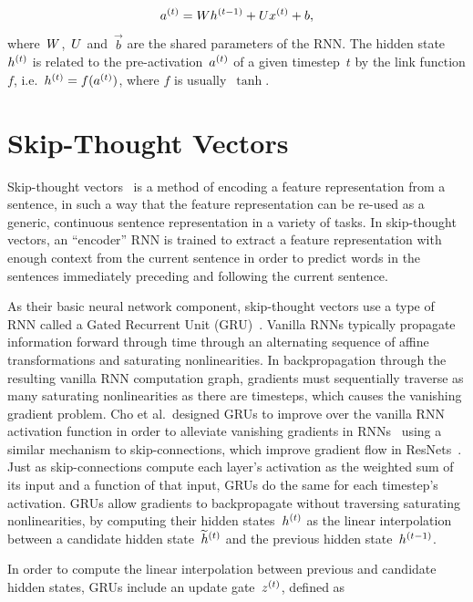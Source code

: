 \begin{equation}
        a^{(t)} = Wh^{(t - 1)} + Ux^{(t)} + b,
\label{eqn:vanilla-rnn}
\end{equation}
where~$W$,~$U$ and~$\vec{b}$ are the shared parameters of the
RNN\@.
The hidden state~$h^{(t)}$ is related to the pre-activation~$a^{(t)}$
of a given timestep~$t$ by the link function $f$,
i.e.\ $h^{(t)} = f(a^{(t)})$, where $f$ is usually~$\tanh$.


\section{Skip-Thought Vectors}

Skip-thought vectors~\cite{kiros2015skip} is a method of encoding a feature
representation from a sentence, in such a way that the feature representation
can be re-used as a generic, continuous sentence representation in a variety of
tasks.
In skip-thought vectors, an ``encoder'' RNN is trained to extract a feature
representation with enough context from the current sentence in order to
predict words in the sentences immediately preceding and following the current
sentence.

As their basic neural network component, skip-thought vectors use a type of RNN
called a Gated Recurrent Unit (GRU)~\cite{cho2014ontheproperties}.
Vanilla RNNs typically propagate information forward through time through an
alternating sequence of affine transformations and saturating nonlinearities.
In backpropagation through the resulting vanilla RNN computation graph,
gradients must sequentially traverse as many saturating nonlinearities as there
are timesteps, which causes the vanishing gradient problem.
Cho et al.\ designed GRUs to improve over the vanilla RNN activation
function in order to alleviate vanishing gradients in
RNNs~\cite{cho2014ontheproperties} using a similar mechanism to
skip-connections, which improve gradient flow in ResNets~\cite{he2016deep}.
Just as skip-connections compute each layer's activation as the weighted sum of
its input and a function of that input, GRUs do the same for each timestep's
activation.
GRUs allow gradients to backpropagate without traversing saturating
nonlinearities, by computing their hidden states~$h^{(t)}$ as the linear
interpolation between a candidate hidden state~$\widetilde{h}^{(t)}$ and
the previous hidden state~$h^{(t - 1)}$.

In order to compute the linear interpolation between previous and candidate
hidden states, GRUs include an update gate~$z^{(t)}$, defined as

